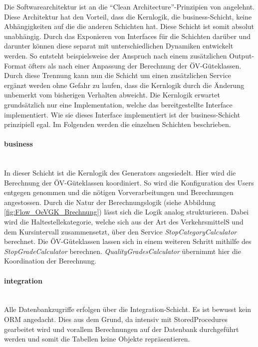 Die Softwarearchitektur ist an die "`Clean Architecture"'-Prinzipien von \cite{martin_clean_architecture} angelehnt.
Diese Architektur hat den Vorteil, dass die Kernlogik, die business-Schicht, keine Abhängigkeiten auf die die anderen Schichten hat.
Diese Schicht ist somit absolut unabhängig.
Durch das Exponieren von Interfaces für die Schichten darüber und darunter können diese separat mit unterschiedlichen Dynamiken entwickelt werden.
So entsteht beispielsweise der Anspruch nach einem zusätzlichen Output-Format öfters als nach einer Anpassung der Berechnung der \acs{ÖV}-Güteklassen.
Durch diese Trennung kann nun die Schicht  um einen zusätzlichen Service ergänzt werden ohne Gefahr zu laufen, dass die Kernlogik durch die Änderung unbemerkt vom bisherigen Verhalten abweicht.
Die Kernlogik erwartet grundsätzlich nur eine Implementation, welche das bereitgestellte Interface implementiert.
Wie sie dieses Interface implementiert ist der business-Schicht prinzipiell egal.
Im Folgenden werden die einzelnen Schichten beschrieben.

\paragraph{business}~\\
\label{layer:business}
In dieser Schicht ist die Kernlogik des Generators angesiedelt.
Hier wird die Berechnung der \acs{ÖV}-Güteklassen koordiniert.
So wird die Konfiguration des Users entgegen genommen und die nötigen Vorverarbeitungen und Berechnungen angestossen.
Durch die Natur der Berechnungslogik (siehe Abbildung \ref{fig:Flow_OeVGK_Brechnung}) lässt sich die Logik analog strukturieren.
Dabei wird die Haltestellekategorie, welche sich aus der Art des VerkehrsmittelS und dem Kursintervall zusammensetzt, über den Service \emph{StopCategoryCalculator} berechnet.
Die \acs{ÖV}-Güteklassen lassen sich in einem weiteren Schritt mithilfe des \emph{StopGradeCalculator} berechnen.
\emph{QualityGradesCalculator} übernimmt hier die Koordination der Berechnung.

\paragraph{integration}~\\
\label{layer:integration}
Alle Datenbankzugriffe erfolgen über die Integration-Schicht.
Es ist bewusst kein \acl{ORM} angedacht.
Dies aus dem Grund, da intensiv mit StoredProcedures gearbeitet wird und vorallem Berechnungen auf der Datenbank durchgeführt werden und somit die Tabellen keine Objekte repräsentieren.

